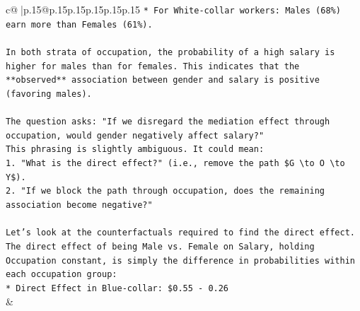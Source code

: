\documentclass{article}
\begin{document}
{\begin{supertabular}{c@{$\;$}|p{.15\linewidth}@{}p{.15\linewidth}p{.15\linewidth}p{.15\linewidth}p{.15\linewidth}p{.15\linewidth}}
{{{\texttt{*   For White{-}collar workers: Males (68\%) earn more than Females (61\%).} \\
\\ 
\texttt{In both strata of occupation, the probability of a high salary is higher for males than for females. This indicates that the **observed** association between gender and salary is positive (favoring males).} \\
\\ 
\texttt{The question asks: "If we disregard the mediation effect through occupation, would gender negatively affect salary?"} \\
\texttt{This phrasing is slightly ambiguous. It could mean:} \\
\texttt{1.  "What is the direct effect?" (i.e., remove the path \$G \textbackslash{}to O \textbackslash{}to Y\$).} \\
\texttt{2.  "If we block the path through occupation, does the remaining association become negative?"} \\
\\ 
\texttt{Let's look at the counterfactuals required to find the direct effect. The direct effect of being Male vs. Female on Salary, holding Occupation constant, is simply the difference in probabilities within each occupation group:} \\
\texttt{*   Direct Effect in Blue{-}collar: \$0.55 {-} 0.26} \\
            }
        }
    }
    & \\ \\


\end{supertabular}}
\end{document}
